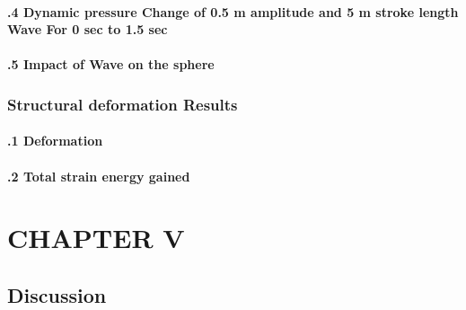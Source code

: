 \documentclass{article}
\begin{document}
\paragraph{\fontsize{10}{12}.4 Dynamic pressure Change of 0.5 m amplitude and 5 m stroke length Wave For 0 sec to 1.5 sec}


\paragraph{\fontsize{10}{12}.5 Impact of Wave on the sphere}


\subsubsection*{\fontsize{10}{12} Structural deformation Results}

\paragraph{\fontsize{10}{12}.1 Deformation}


\paragraph{\fontsize{10}{12}.2 Total strain energy gained}

\clearpage


\section*{\centering\fontsize{14}{16}\selectfont CHAPTER V}

\subsection*{\fontsize{12}{14} Discussion}
\end{document}
